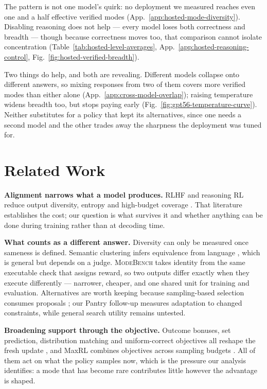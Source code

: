 \documentclass{article}
\newcommand{\1}{\mathbf 1}
\newcommand{\mb}{\textsc{ModeBench}}
\theoremstyle{remark}
\theoremstyle{definition}
\theoremstyle{plain}
\begin{document}
The pattern is not one model's quirk: no deployment we measured reaches even
one and a half effective verified modes
(App.~\ref{app:hosted-mode-diversity}). Disabling reasoning does not help
--- every model loses both correctness and breadth --- though because
correctness moves too, that comparison cannot isolate concentration
(Table~\ref{tab:hosted-level-averages}, App.~\ref{app:hosted-reasoning-control},
Fig.~\ref{fig:hosted-verified-breadth}).

Two things do help, and both are revealing. Different models collapse onto
different answers, so mixing responses from two of them covers more verified
modes than either alone (App.~\ref{app:cross-model-overlap}); raising
temperature widens breadth too, but stops paying early
(Fig.~\ref{fig:gpt56-temperature-curve}). Neither substitutes for a policy
that kept its alternatives, since one needs a second model and the other trades
away the sharpness the deployment was tuned for.

\section{Related Work}
\label{sec:related}

\textbf{Alignment narrows what a model produces.} RLHF and reasoning RL reduce
output diversity, entropy and high-budget coverage
\citep{kirk2024understanding,dang2025diversity,cui2025entropy,yue2025rlvrlimit}.
That literature establishes the cost; our question is what survives it and
whether anything can be done during training rather than at decoding time.

\textbf{What counts as a different answer.} Diversity can only be measured once
sameness is defined. Semantic clustering infers equivalence from language
\citep{farquhar2024detecting}, which is general but depends on a judge. \mb{}
takes identity from the same executable check that assigns reward, so two
outputs differ exactly when they execute differently --- narrower, cheaper, and
one shared unit for training and evaluation. Alternatives are worth keeping
because sampling-based selection consumes proposals
\citep{brown2024monkeys,snell2024testtime,cobbe2021training,lightman2023lets};
our Pantry follow-up measures adaptation to changed constraints, while general
search utility remains untested.

\textbf{Broadening support through the objective.} Outcome bonuses, set
prediction, distribution matching and uniform-correct objectives all reshape
the fresh update
\citep{song2025outcome,chen2025passktraining,li2025divergence,li2026setpo,li2026distribution,lochab2026ucpo},
and MaxRL combines objectives across sampling budgets \citep{tajwar2026maxrl}.
All of them act on what the policy samples now, which is the pressure our
analysis identifies: a mode that has become rare contributes little however the
advantage is shaped.
\end{document}
